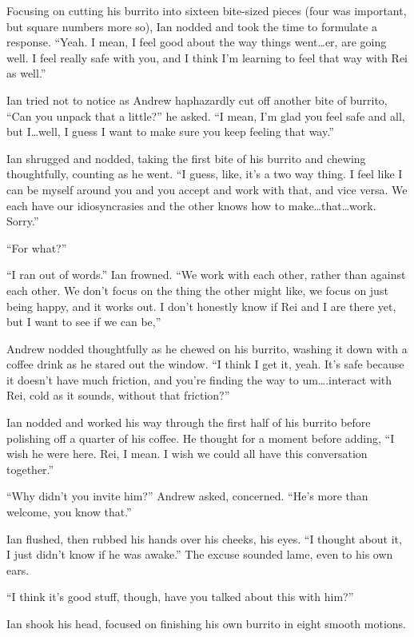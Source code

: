 \documentclass[12pt,letterpaper,oneside]{memoir}
\begin{document}
  Focusing on cutting his burrito into sixteen bite-sized pieces (four was important, but square numbers more so), Ian nodded and took the time to formulate a response. ``Yeah. I mean, I feel good about the way things went\ldots{}er, are going well. I feel really safe with you, and I think I'm learning to feel that way with Rei as well.''

  Ian tried not to notice as Andrew haphazardly cut off another bite of burrito, ``Can you unpack that a little?'' he asked. ``I mean, I'm glad you feel safe and all, but I\ldots{}well, I guess I want to make sure you keep feeling that way.''

  Ian shrugged and nodded, taking the first bite of his burrito and chewing thoughtfully, counting as he went. ``I guess, like, it's a two way thing. I feel like I can be myself around you and you accept and work with that, and vice versa. We each have our idiosyncrasies and the other knows how to make\ldots{}that\ldots{}work. Sorry.''

  ``For what?''

  ``I ran out of words.'' Ian frowned. ``We work with each other, rather than against each other. We don't focus on the thing the other might like, we focus on just being happy, and it works out. I don't honestly know if Rei and I are there yet, but I want to see if we can be,''

  Andrew nodded thoughtfully as he chewed on his burrito, washing it down with a coffee drink as he stared out the window. ``I think I get it, yeah. It's safe because it doesn't have much friction, and you're finding the way to um\ldots{}.interact with Rei, cold as it sounds, without that friction?''

  Ian nodded and worked his way through the first half of his burrito before polishing off a quarter of his coffee. He thought for a moment before adding, ``I wish he were here. Rei, I mean. I wish we could all have this conversation together.''

  ``Why didn't you invite him?'' Andrew asked, concerned. ``He's more than welcome, you know that.''

  Ian flushed, then rubbed his hands over his cheeks, his eyes. ``I thought about it, I just didn't know if he was awake.'' The excuse sounded lame, even to his own ears.

  ``I think it's good stuff, though, have you talked about this with him?''

  Ian shook his head, focused on finishing his own burrito in eight smooth motions.
\end{document}
